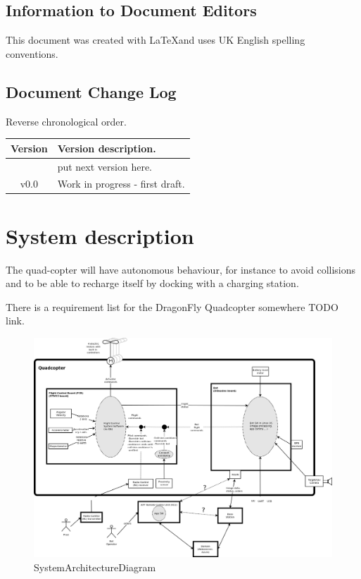 \documentclass[a4paper]{article}
\begin{document}
\subsection{Information to Document Editors}
\label{sec:editors}
This document was created with \LaTeX and uses UK English spelling conventions.

\subsection{Document Change Log}
Reverse chronological order.

\begin{center}
\begin{tabular}{ c | l }
  \hline
  Version & Version description. \\ \hline
   & put next version here. \\ \hline
  v0.0 & Work in progress - first draft. \\ \hline
\end{tabular}
\end{center}

\newpage

\section{System description}
The quad-copter will have autonomous behaviour, for instance to avoid collisions and to be able to recharge itself by docking with a charging station.

There is a requirement list for the DragonFly Quadcopter somewhere TODO link.

\begin{figure}[!h]
    \centering
    \includegraphics[width=\textwidth]{images/SystemArchitectureDiagram_DF.png}
    \caption{SystemArchitectureDiagram}
    \label{fig:sysarchdiag}
\end{figure}
\end{document}
